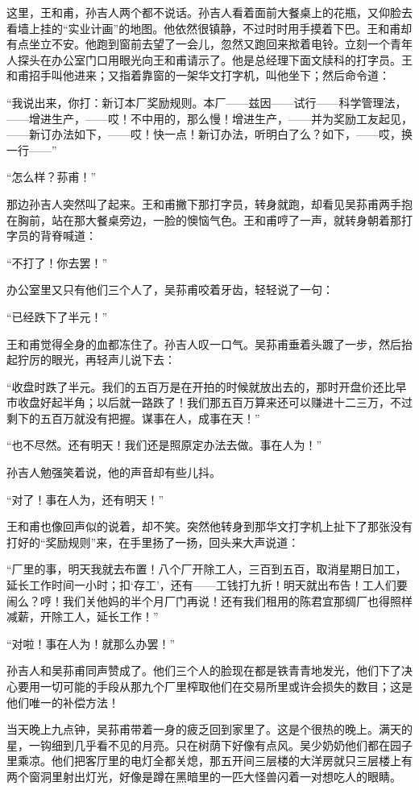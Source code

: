 \par 这里，王和甫，孙吉人两个都不说话。孙吉人看着面前大餐桌上的花瓶，又仰脸去看墙上挂的“实业计画”的地图。他依然很镇静，不过时时用手摸着下巴。王和甫却有点坐立不安。他跑到窗前去望了一会儿，忽然又跑回来揿着电铃。立刻一个青年人探头在办公室门口用眼光向王和甫请示了。他是总经理下面文牍科的打字员。王和甫招手叫他进来；又指着靠窗的一架华文打字机，叫他坐下；然后命令道：
\par “我说出来，你打：新订本厂奖励规则。本厂——兹因——试行——科学管理法，——增进生产，——哎！不中用的，那么慢！增进生产，——并为奖励工友起见，——新订办法如下，——哎！快一点！新订办法，听明白了么？如下，——哎，换一行——”
\par “怎么样？荪甫！”
\par 那边孙吉人突然叫了起来。王和甫撇下那打字员，转身就跑，却看见吴荪甫两手抱在胸前，站在那大餐桌旁边，一脸的懊恼气色。王和甫哼了一声，就转身朝着那打字员的背脊喊道：
\par “不打了！你去罢！”
\par 办公室里又只有他们三个人了，吴荪甫咬着牙齿，轻轻说了一句：
\par “已经跌下了半元！”
\par 王和甫觉得全身的血都冻住了。孙吉人叹一口气。吴荪甫垂着头踱了一步，然后抬起狞厉的眼光，再轻声儿说下去：
\par “收盘时跌了半元。我们的五百万是在开拍的时候就放出去的，那时开盘价还比早市收盘好起半角；以后就一路跌了！我们那五百万算来还可以赚进十二三万，不过剩下的五百万就没有把握。谋事在人，成事在天！”
\par “也不尽然。还有明天！我们还是照原定办法去做。事在人为！”
\par 孙吉人勉强笑着说，他的声音却有些儿抖。
\par “对了！事在人为，还有明天！”
\par 王和甫也像回声似的说着，却不笑。突然他转身到那华文打字机上扯下了那张没有打好的“奖励规则”来，在手里扬了一扬，回头来大声说道：
\par “厂里的事，明天我就去布置！八个厂开除工人，三百到五百，取消星期日加工，延长工作时间一小时；扣‘存工’，还有——工钱打九折！明天就出布告！工人们要闹么？哼！我们关他妈的半个月厂门再说！还有我们租用的陈君宜那绸厂也得照样减薪，开除工人，延长工作！”
\par “对啦！事在人为！就那么办罢！”
\par 孙吉人和吴荪甫同声赞成了。他们三个人的脸现在都是铁青青地发光，他们下了决心要用一切可能的手段从那九个厂里榨取他们在交易所里或许会损失的数目；这是他们唯一的补偿方法！
\par 当天晚上九点钟，吴荪甫带着一身的疲乏回到家里了。这是个很热的晚上。满天的星，一钩细到几乎看不见的月亮。只在树荫下好像有点风。吴少奶奶他们都在园子里乘凉。他们把客厅里的电灯全都关熄，那五开间三层楼的大洋房就只三层楼上有两个窗洞里射出灯光，好像是蹲在黑暗里的一匹大怪兽闪着一对想吃人的眼睛。
